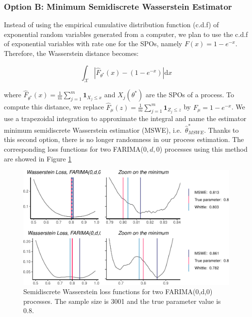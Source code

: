 \documentclass[
  11pt,
]{article}
\begin{document}
\hypertarget{option-b-minimum-semidiscrete-wasserstein-estimator}{%
\subsubsection{Option B: Minimum Semidiscrete Wasserstein
Estimator}\label{option-b-minimum-semidiscrete-wasserstein-estimator}}

Instead of using the empirical cumulative distribution function (c.d.f)
of exponential random variables generated from a computer, we plan to
use the c.d.f of exponential variables with rate one for the SPOs,
namely \(F(x)=1-e^{-x}\). Therefore, the Wasserstein distance becomes:

\begin{equation}
\int_\mathcal{X}\left|\hat F_{\theta^*}(x)- (1 - e^{-x})\right| \mathrm{d} x 
\end{equation}

where
\(\hat F_{\theta^*}(x) = \frac{1}{m} \sum_{j=1}^{m} \mathbf{1}_{X_{j} \leq x}\)
and \(X_j (\theta^*)\) are the SPOs of a process. To compute this distance, we
replace
\(\hat F_\mu(z) = \frac{1}{m}\sum_{j=1}^{m} \mathbf{1}_{Z_{j} \leq z}\)
by \(F_\mu = 1 - e^{-x}\). We use a trapezoidal integration to
approximate the integral and name the estimator minimum semidiscrete
Wasserstein estimatior (MSWE), i.e.~\(\hat \theta^*_{MSWE}\). Thanks to
this second option, there is no longer randomness in our process
estimation. The corresponding loss functions for two FARIMA(\(0,d,0\))
processes using this method are showed in Figure \ref{fig:semi_wass}

\begin{figure}

{\centering \includegraphics[width=0.6\linewidth]{Master_thesis_V4_files/figure-latex/semi_wass-1} 

}

\caption{Semidiscrete Wasserstein loss functions for two FARIMA(0,d,0) processes. The sample size is 3001 and the true parameter value is 0.8.}\label{fig:semi_wass}
\end{figure}
\end{document}
